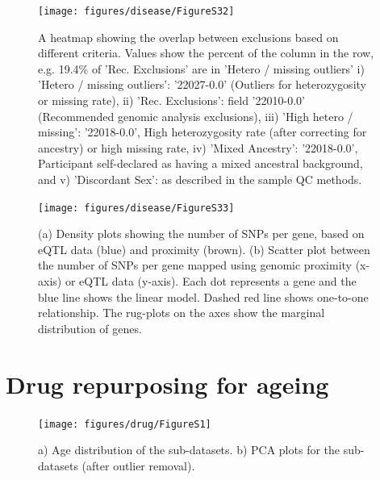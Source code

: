 \documentclass[12pt,twoside]{unicam}
\begin{document}
\begin{figure}

{\centering \texttt{[image: figures/disease/FigureS32]} 

}

\caption[A heatmap showing the overlap between sample exclusions based on different criteria.]{A heatmap showing the overlap between exclusions based on different criteria. Values show the percent of the column in the row, e.g. 19.4\% of 'Rec. Exclusions' are in 'Hetero / missing outliers' i) 'Hetero / missing outliers': '22027-0.0' (Outliers for heterozygosity or missing rate), ii) 'Rec. Exclusions': field '22010-0.0' (Recommended genomic analysis exclusions), iii) 'High hetero / missing': '22018-0.0', High heterozygosity rate (after correcting for ancestry) or high missing rate, iv) 'Mixed Ancestry': '22018-0.0', Participant self-declared as having a mixed ancestral background, and v) 'Discordant Sex': as described in the sample QC methods.}\label{fig:disFigS32}
\end{figure}

\begin{figure}

{\centering \texttt{[image: figures/disease/FigureS33]} 

}

\caption[Relationships between variant-gene associations based on proximity and eQTL data.]{(a) Density plots showing the number of SNPs per gene, based on eQTL data (blue) and proximity (brown). (b) Scatter plot between the number of SNPs per gene mapped using genomic proximity (x-axis) or eQTL data (y-axis). Each dot represents a gene and the blue line shows the linear model. Dashed red line shows one-to-one relationship. The rug-plots on the axes show the marginal distribution of genes. }\label{fig:disFigS33}
\end{figure}

\newpage

\hypertarget{drug-repurposing-for-ageing-1}{%
\section{Drug repurposing for ageing}\label{drug-repurposing-for-ageing-1}}

\begin{figure}

{\centering \texttt{[image: figures/drug/FigureS1]} 

}

\caption[Age distribution of individual datasets.]{a) Age distribution of the sub-datasets. b) PCA plots for the sub-datasets (after outlier removal).}\label{fig:drugFigS1}
\end{figure}
\end{document}
